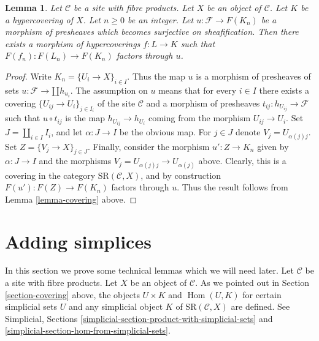 \documentclass{stacks-project}
\theoremstyle{plain}
\newtheorem{lemma}[subsection]{Lemma}
\theoremstyle{definition}
\theoremstyle{remark}
\numberwithin{equation}{subsection}
\def\Hom{\mathop{\mathrm{Hom}}\nolimits}
\begin{document}
\begin{lemma}
\label{lemma-covering-sheaf}
Let $\mathcal{C}$ be a site with fibre products.
Let $X$ be an object of $\mathcal{C}$.
Let $K$ be a hypercovering of $X$.
Let $n \geq 0$ be an integer.
Let $u : \mathcal{F} \to F(K_n)$ be a morphism
of presheaves which becomes surjective
on sheafification.
Then there exists a morphism of hypercoverings
$f: L \to K$ such that $F(f_n) : F(L_n) \to F(K_n)$
factors through $u$.
\end{lemma}

\begin{proof}
Write $K_n = \{U_i \to X\}_{i \in I}$.
Thus the map $u$ is a morphism of presheaves of sets
$u : \mathcal{F} \to \amalg h_{u_i}$.
The assumption on $u$ means that for every
$i \in I$ there exists a covering $\{U_{ij} \to U_i\}_{j \in I_i}$
of the site $\mathcal{C}$ and a morphism of presheaves
$t_{ij} : h_{U_{ij}} \to \mathcal{F}$ such that
$u \circ t_{ij}$ is the map $h_{U_{ij}} \to h_{U_i}$
coming from the morphism $U_{ij} \to U_i$.
Set $J = \amalg_{i \in I} I_i$, and let
$\alpha : J \to I$ be the obvious map.
For $j \in J$ denote $V_j = U_{\alpha(j)j}$. Set
$Z = \{V_j \to X\}_{j \in J}$.
Finally, consider the morphism
$u' : Z \to K_n$ given by $\alpha : J \to I$
and the morphisms $V_j = U_{\alpha(j)j} \to U_{\alpha(j)}$
above. Clearly, this is a covering in the
category $\text{SR}(\mathcal{C}, X)$, and by
construction $F(u') : F(Z) \to F(K_n)$ factors through $u$.
Thus the result follows from Lemma \ref{lemma-covering} above.
\end{proof}


\section{Adding simplices}
\label{section-adding-simplices}

\noindent
In this section we prove some technical lemmas which we will need later.
Let $\mathcal{C}$ be a site with fibre products.
Let $X$ be an object of $\mathcal{C}$.
As we pointed out in Section \ref{section-covering} above,
the objects $U \times K$ and $\Hom(U, K)$
for certain simplicial sets $U$
and any simplicial object $K$ of $\text{SR}(\mathcal{C}, X)$
are defined. See Simplicial, Sections
\ref{simplicial-section-product-with-simplicial-sets} and
\ref{simplicial-section-hom-from-simplicial-sets}.
\end{document}
